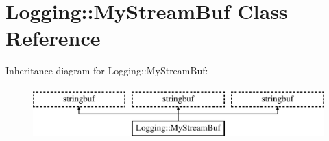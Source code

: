 \hypertarget{classLogging_1_1MyStreamBuf}{\section{Logging\-:\-:My\-Stream\-Buf Class Reference}
\label{classLogging_1_1MyStreamBuf}
}
Inheritance diagram for Logging\-:\-:My\-Stream\-Buf\-:\begin{figure}[H]
\begin{center}
\leavevmode
\includegraphics[height=2.000000cm]{classLogging_1_1MyStreamBuf}
\end{center}
\end{figure}
